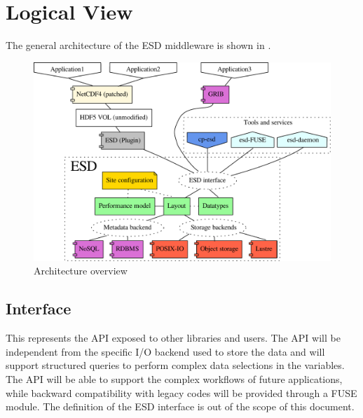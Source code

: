 \documentclass{../../template/esiwace-report}
\begin{document}
\section{Logical View} %


The general architecture of the ESD middleware is shown in . 

\begin{figure}
\centering
\vspace*{-1em}
\includegraphics[width=0.98\columnwidth]{figures/architecture-backend}
\vspace*{-0.7em}
\caption{Architecture overview}
\label{fig:architecture}
\vspace*{-1em}
\end{figure}

\subsection{Interface}
This represents the API exposed to other libraries and users. The API will be independent from the specific I/O backend used to store the data and will support structured queries to perform complex data selections in the variables. The API will be able to support the complex workflows of future applications, while backward compatibility with legacy codes will be provided through a FUSE module. The definition of the ESD interface is out of the scope of this document.
\end{document}
